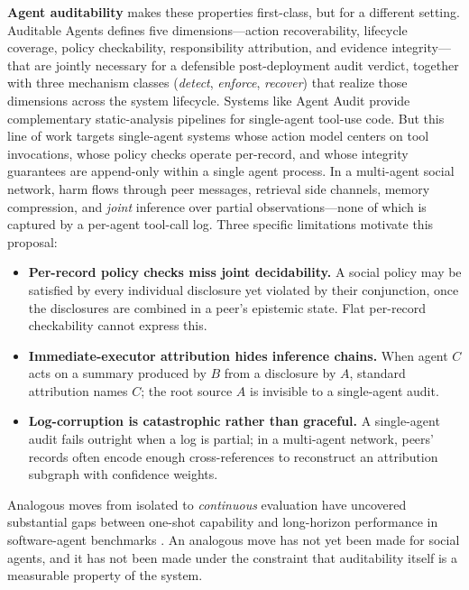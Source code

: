 \documentclass{article}
\begin{document}
\textbf{Agent auditability} makes these properties first-class, but for a different setting. Auditable Agents \citep{nian2026auditable} defines five dimensions---action recoverability, lifecycle coverage, policy checkability, responsibility attribution, and evidence integrity---that are jointly necessary for a defensible post-deployment audit verdict, together with three mechanism classes (\emph{detect}, \emph{enforce}, \emph{recover}) that realize those dimensions across the system lifecycle. Systems like Agent Audit \citep{zhang2026agentaudit} provide complementary static-analysis pipelines for single-agent tool-use code. But this line of work targets single-agent systems whose action model centers on tool invocations, whose policy checks operate per-record, and whose integrity guarantees are append-only within a single agent process. In a multi-agent social network, harm flows through peer messages, retrieval side channels, memory compression, and \emph{joint} inference over partial observations---none of which is captured by a per-agent tool-call log. Three specific limitations motivate this proposal:

\begin{itemize}
  \item \textbf{Per-record policy checks miss joint decidability.} A social policy may be satisfied by every individual disclosure yet violated by their conjunction, once the disclosures are combined in a peer's epistemic state. Flat per-record checkability cannot express this.
  \item \textbf{Immediate-executor attribution hides inference chains.} When agent $C$ acts on a summary produced by $B$ from a disclosure by $A$, standard attribution names $C$; the root source $A$ is invisible to a single-agent audit.
  \item \textbf{Log-corruption is catastrophic rather than graceful.} A single-agent audit fails outright when a log is partial; in a multi-agent network, peers' records often encode enough cross-references to reconstruct an attribution subgraph with confidence weights.
\end{itemize}

Analogous moves from isolated to \emph{continuous} evaluation have uncovered substantial gaps between one-shot capability and long-horizon performance in software-agent benchmarks \citep{deng2026evoclaw}. An analogous move has not yet been made for social agents, and it has not been made under the constraint that auditability itself is a measurable property of the system.
\end{document}
